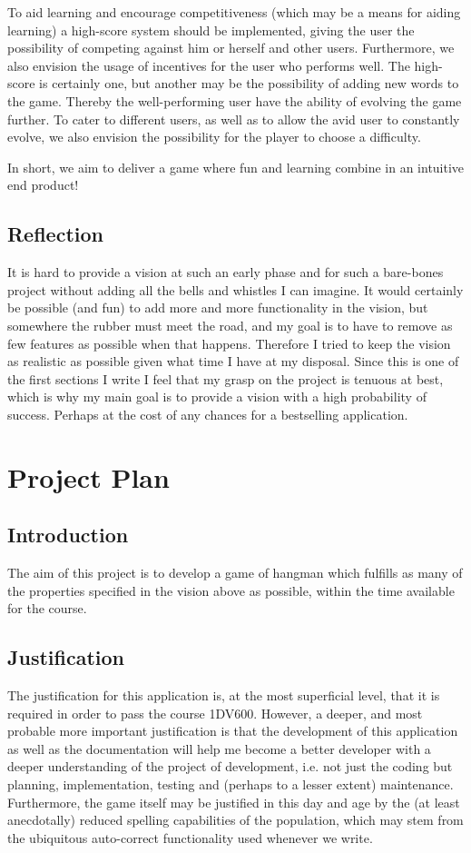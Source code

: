 \documentclass[12pt, letterpaper]{article}
\begin{document}
 \newline
 To aid learning and encourage competitiveness (which may be a means for aiding learning) a high-score system should be implemented, giving the user the possibility of competing against him or herself and other users. Furthermore, we also envision the usage of incentives for the user who performs well. The high-score is certainly one, but another may be the possibility of adding new words to the game. Thereby the well-performing user have the ability of evolving the game further. To cater to different users, as well as to allow the avid user to constantly evolve, we also envision the possibility for the player to choose a difficulty.
 \newline
 
 \newline
  In short, we aim to deliver a game where fun and learning combine in an intuitive end product!
  \subsection{Reflection}
  It is hard to provide a vision at such an early phase and for such a bare-bones project without adding all the bells and whistles I can imagine. It would certainly be possible (and fun) to add more and more functionality in the vision, but somewhere the rubber must meet the road, and my goal is to have to remove as few features as possible when that happens. Therefore I tried to keep the vision as realistic as possible given what time I have at my disposal. Since this is one of the first sections I write I feel that my grasp on the project is tenuous at best, which is why my main goal is to provide a vision with a high probability of success. Perhaps at the cost of any chances for a bestselling application.  


\newpage 
\section{Project Plan}
\subsection{Introduction}
The aim of this project is to develop a game of hangman which fulfills as many of the properties specified in the vision above as possible, within the time available for the course.
\subsection{Justification}
The justification for this application is, at the most superficial level, that it is required in order to pass the course 1DV600. However, a deeper, and most probable more important justification is that the development of this application as well as the documentation will help me become a better developer with a deeper understanding of the project of development, i.e. not just the coding but planning, implementation, testing and (perhaps to a lesser extent) maintenance. Furthermore, the game itself may be justified in this day and age by the (at least anecdotally) reduced spelling capabilities of the population, which may stem from the ubiquitous auto-correct functionality used whenever we write. 
\end{document}

